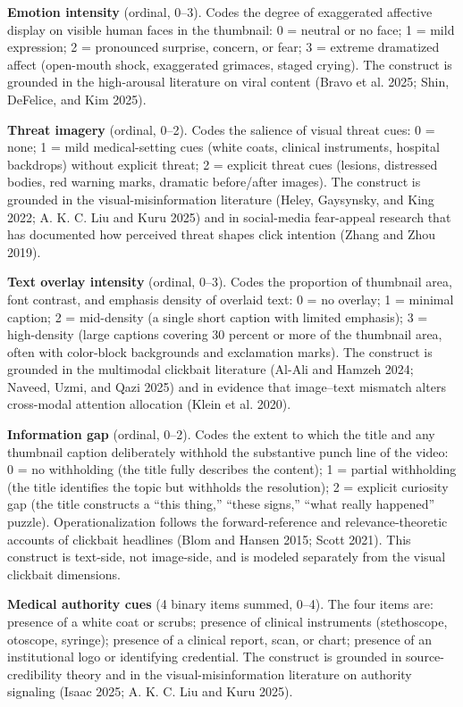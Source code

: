 \documentclass[
  12pt,
]{article}
\begin{document}
\textbf{Emotion intensity} (ordinal, 0--3). Codes the degree of
exaggerated affective display on visible human faces in the thumbnail: 0
= neutral or no face; 1 = mild expression; 2 = pronounced surprise,
concern, or fear; 3 = extreme dramatized affect (open-mouth shock,
exaggerated grimaces, staged crying). The construct is grounded in the
high-arousal literature on viral content (Bravo et al. 2025; Shin,
DeFelice, and Kim 2025).

\textbf{Threat imagery} (ordinal, 0--2). Codes the salience of visual
threat cues: 0 = none; 1 = mild medical-setting cues (white coats,
clinical instruments, hospital backdrops) without explicit threat; 2 =
explicit threat cues (lesions, distressed bodies, red warning marks,
dramatic before/after images). The construct is grounded in the
visual-misinformation literature (Heley, Gaysynsky, and King 2022; A. K.
C. Liu and Kuru 2025) and in social-media fear-appeal research that has
documented how perceived threat shapes click intention (Zhang and Zhou
2019).

\textbf{Text overlay intensity} (ordinal, 0--3). Codes the proportion of
thumbnail area, font contrast, and emphasis density of overlaid text: 0
= no overlay; 1 = minimal caption; 2 = mid-density (a single short
caption with limited emphasis); 3 = high-density (large captions
covering 30 percent or more of the thumbnail area, often with
color-block backgrounds and exclamation marks). The construct is
grounded in the multimodal clickbait literature (Al-Ali and Hamzeh 2024;
Naveed, Uzmi, and Qazi 2025) and in evidence that image--text mismatch
alters cross-modal attention allocation (Klein et al. 2020).

\textbf{Information gap} (ordinal, 0--2). Codes the extent to which the
title and any thumbnail caption deliberately withhold the substantive
punch line of the video: 0 = no withholding (the title fully describes
the content); 1 = partial withholding (the title identifies the topic
but withholds the resolution); 2 = explicit curiosity gap (the title
constructs a ``this thing,'' ``these signs,'' ``what really happened''
puzzle). Operationalization follows the forward-reference and
relevance-theoretic accounts of clickbait headlines (Blom and Hansen
2015; Scott 2021). This construct is text-side, not image-side, and is
modeled separately from the visual clickbait dimensions.

\textbf{Medical authority cues} (4 binary items summed, 0--4). The four
items are: presence of a white coat or scrubs; presence of clinical
instruments (stethoscope, otoscope, syringe); presence of a clinical
report, scan, or chart; presence of an institutional logo or identifying
credential. The construct is grounded in source-credibility theory and
in the visual-misinformation literature on authority signaling (Isaac
2025; A. K. C. Liu and Kuru 2025).
\end{document}
